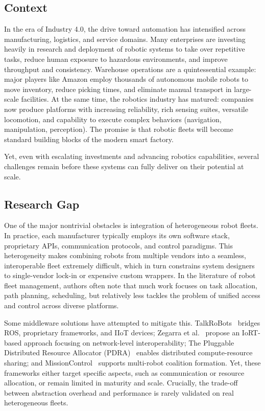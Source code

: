 \documentclass[conference]{IEEEtran}
\begin{document}
\subsection{Context}
In the era of Industry 4.0, 
 the drive toward automation has intensified across manufacturing, 
 logistics, and service domains. 
% 
Many enterprises are investing heavily in research and deployment of robotic systems 
to take over repetitive tasks, reduce human exposure to hazardous environments, 
 and improve throughput and consistency. 
% 
Warehouse operations are a quintessential example: 
 major players like Amazon employ thousands of autonomous mobile robots to move inventory, 
 reduce picking times, and eliminate manual transport in large-scale facilities.
%
At the same time, the robotics industry has matured: 
 companies now produce platforms with increasing reliability, rich sensing suites, versatile locomotion, 
 and capability to execute complex behaviors (navigation, manipulation, perception). 
% 
The promise is that robotic fleets will become standard building blocks of the modern smart factory.

Yet, even with escalating investments and advancing robotics capabilities, 
 several challenges remain before these systems can fully deliver on their potential at scale.

\subsection{Research Gap}

One of the major nontrivial obstacles is integration of heterogeneous robot fleets. 
%
In practice, 
 each manufacturer typically employs its own software stack, proprietary APIs, 
 communication protocols, and control paradigms. 
% 
This heterogeneity makes combining robots from multiple vendors into a seamless, 
 interoperable fleet extremely difficult, which in turn constrains system designers 
 to single-vendor lock-in or expensive custom wrappers. 
% 
In the literature of robot fleet management, 
 authors often note that much work focuses on task allocation, path planning, scheduling, 
 but relatively less tackles the problem of unified access and control across diverse platforms. 

Some middleware solutions have attempted to mitigate this. 
%
TalkRoBots~\cite{ayaida2022fi} bridges ROS, proprietary frameworks, and IIoT devices; 
 Zegarra et al.~\cite{cuadroszegarra2024jsan} propose an IoRT-based approach focusing on network-level interoperability; 
 The Pluggable Distributed Resource Allocator (PDRA)~\cite{rossi2020iros} enables distributed compute-resource sharing; 
 and MissionControl~\cite{rodrigues2022jss} supports multi-robot coalition formation. 
% 
Yet,
 these frameworks either target specific aspects, 
 such as communication or resource allocation,
 or remain limited in maturity and scale. 
% 
Crucially, the trade-off between abstraction overhead 
 and performance is rarely validated on real heterogeneous fleets.
\end{document}

